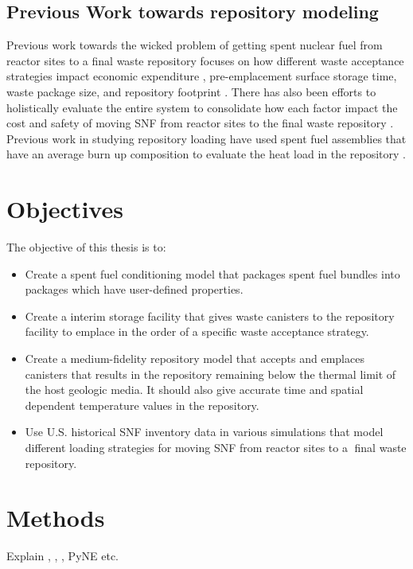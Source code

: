 \subsection{Previous Work towards repository modeling}
Previous work towards the wicked problem of getting spent nuclear fuel from reactor 
sites to a final waste repository focuses on how different waste acceptance strategies 
impact economic expenditure \cite{nesbit_proposed_2015}, pre-emplacement 
surface storage time, waste package size, and repository 
footprint \cite{greenberg_application_2012}. 
There has also been efforts to holistically evaluate the entire system to consolidate 
how each factor impact the cost and safety of moving SNF from 
reactor sites to the final waste repository \cite{nutt_waste_2015}.
Previous work in studying repository loading have used spent fuel assemblies 
that have an average burn up composition \cite{johnson_optimizing_2016} 
to evaluate the heat load in the repository \cite{greenberg_application_2012}. 

\section{Objectives}
The objective of this thesis is to: 
\begin{itemize}
    \item Create a \Cyclus spent fuel conditioning model that
    packages spent fuel bundles into packages which have
    user-defined properties.
    \item Create a \Cyclus interim storage facility that gives 
    waste canisters to the repository facility to emplace in the 
    order of a specific waste acceptance strategy. 
    \item Create a \Cyclus medium-fidelity repository model that
    accepts and emplaces canisters that results in the repository 
    remaining below the thermal limit of the host geologic media.
    It should also give accurate time and spatial dependent 
    temperature values in the repository. 
    \item Use U.S. historical SNF inventory data 
    \cite{peterson_unf-st&dards_2017} in various simulations
    that model different loading strategies for moving 
    \gls{SNF} from reactor sites to a final waste repository.
\end{itemize}


\section{Methods}
Explain \Cyclus, \Cycamore, \Cyder, PyNE etc.  

